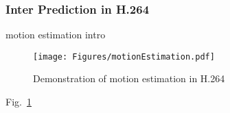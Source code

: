 \subsubsection{Inter Prediction in H.264}
\label{sec::MEIntro}
%
{\color{red}motion estimation intro}
\begin{figure}
\begin{center}
\texttt{[image: Figures/motionEstimation.pdf]}
\caption{\label{fig::MEIntro}Demonstration of motion estimation in H.264}
\end{center}
\end{figure}
Fig.~\ref{fig::MEIntro}